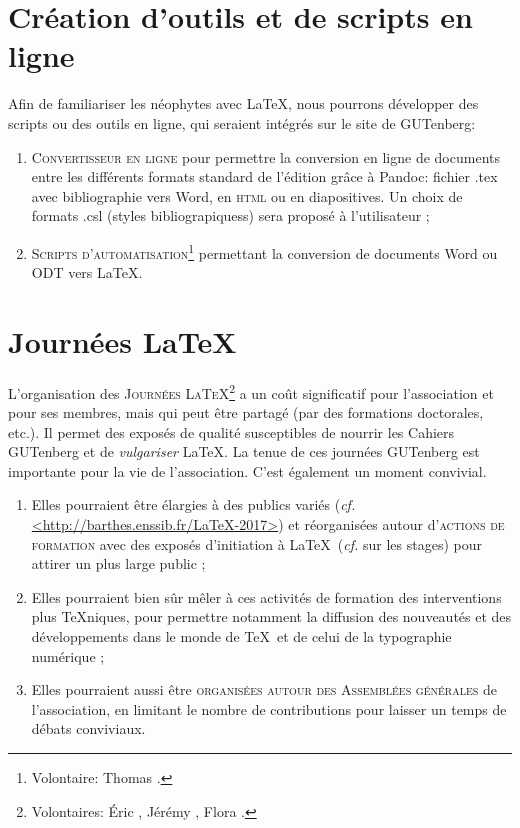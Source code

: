 \documentclass{tufte-handout}
\newcommand{\ratio}[3][]{\marginpar{\footnotesize{\textcolor{teal}{Temps requis: #2 / Utilité: #3}\par\noindent \textcolor{teal}{#1}}}}
\begin{document}
\section{Création d'outils et de scripts en ligne}

Afin de familiariser les néophytes avec \LaTeX\ratio[Petites contributions, par les connaisseurs]{++}{+++}, nous pourrons développer des scripts ou des outils en ligne, qui seraient intégrés sur le site de GUTenberg:

\begin{enumerate}
	\item\textsc{Convertisseur en ligne} pour permettre la conversion en ligne de documents entre les différents formats standard de l'édition grâce à Pandoc: fichier .tex avec bibliographie vers Word, en \textsc{html} ou en diapositives. Un choix de formats .csl (styles bibliograpiquess) sera  proposé à l'utilisateur ;
	\item\textsc{Scripts d'automatisation}\footnote{Volontaire: Thomas .} permettant la conversion de documents Word ou ODT vers \LaTeX.
\end{enumerate}


\section{Journées \LaTeX}

L'organisation des \textsc{Journées \LaTeX}\ratio[Coûteuses, mais utiles et susceptibles de s'intégrer dans les autres projets]{+++}{+++}\footnote{Volontaires: Éric , Jérémy , Flora .} a un coût significatif pour l'association et pour ses membres, mais qui peut être partagé (par des formations doctorales, etc.). Il permet des exposés de qualité susceptibles de nourrir les Cahiers GUTenberg et de \emph{vulgariser} \LaTeX. La tenue de ces journées GUTenberg est importante pour la vie de l'association. C'est également un moment convivial.

\begin{enumerate}
	\item Elles pourraient être élargies à des publics variés (\emph{cf.} \url{<http://barthes.enssib.fr/LaTeX-2017>}) et réorganisées autour d'\textsc{actions de formation} avec des exposés d'initiation à \LaTeX\ (\emph{cf.} sur les stages) pour attirer un plus large public ;
	\item Elles pourraient bien sûr mêler à ces activités de formation des interventions plus \TeX niques, pour permettre notamment la diffusion des nouveautés et des développements dans le monde de \TeX\ et de celui de la typographie numérique ;
	\item Elles pourraient aussi être \textsc{organisées autour des Assemblées générales} de l'association, en limitant le nombre de contributions pour laisser un temps de débats conviviaux.
\end{enumerate}
\end{document}
